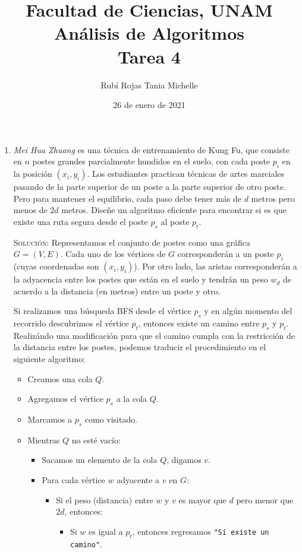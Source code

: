 \documentclass[letterpaper,11pt]{article}
\title{Facultad de Ciencias, UNAM \\ 
       Análisis de Algoritmos \\ 
       Tarea 4}
\author{Rubí Rojas Tania Michelle}
\date{26 de enero de 2021}
\begin{document}
\maketitle

\begin{enumerate}
    \item \textit{Mei Hua Zhuang} es una técnica de entrenamiento de Kung Fu, 
    que consiste en $n$ postes grandes parcialmente hundidos en el suelo, con 
    cada poste $p_i$ en la posición $(x_i, y_i)$. Los estudiantes practican 
    técnicas de artes marciales pasando de la parte superior de un poste a la 
    parte superior de otro poste. Pero para mantener el equilibrio, cada paso 
    debe tener más de $d$ metros pero menos de $2d$ metros. Diseñe un algoritmo 
    eficiente para encontrar si es que existe una ruta segura desde el poste 
    $p_s$ al poste $p_t$.

    \textsc{Solución:} Representamos el conjunto de postes como una gráfica 
    $G = (V, E)$. Cada uno de los vértices de $G$ corresponderán a un poste 
    $p_i$ (cuyas coordenadas son $(x_i,y_i)$). Por otro lado, las aristas 
    corresponderán a la adyacencia entre los postes que están en el suelo y 
    tendrán un peso $w_d$ de acuerdo a la distancia (en metros) entre un 
    poste y otro. 

    Si realizamos una búsqueda BFS desde el vértice $p_s$ y en algún momento 
    del recorrido descubrimos el vértice $p_t$, entonces existe un camino entre 
    $p_s$ y $p_t$. Realizándo una modificación para que el camino cumpla con 
    la restricción de la distancia entre los postes, podemos traducir el 
    procedimiento en el siguiente algoritmo:
    \begin{itemize}
        \item Creamos una cola $Q$.
        \item Agregamos el vértice $p_s$ a la cola $Q$.
        \item Marcamos a $p_s$ como visitado.
        \item Mientras $Q$ no esté vacío:
        \begin{itemize}
            \item Sacamos un elemento de la cola $Q$, digamos $v$.
            \item Para cada vértice $w$ adyacente a $v$ en $G$:
            \begin{itemize}
                \item Si el peso (distancia) entre $w$ y $v$ es mayor que $d$ 
                pero menor que $2d$, entonces:
                \begin{itemize}
                    \item Si $w$ es igual a $p_t$, entonces regresamos 
                    \texttt{"Sí existe un camino"}.


\end{itemize}
\end{itemize}
\end{itemize}
\end{itemize}
\end{enumerate}
\end{document}

